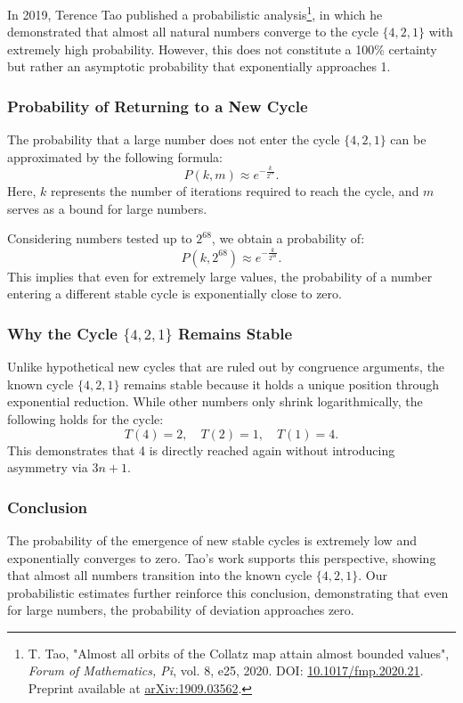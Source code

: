 \documentclass[a4paper,12pt]{article}
\begin{document}
In 2019, Terence Tao published a probabilistic analysis\footnote{T. Tao, "Almost all orbits of the Collatz map attain almost bounded values", \textit{Forum of Mathematics, Pi}, vol. 8, e25, 2020. DOI: \href{https://doi.org/10.1017/fmp.2020.21}{10.1017/fmp.2020.21}. Preprint available at \href{https://arxiv.org/abs/1909.03562}{arXiv:1909.03562}.}, in which he demonstrated that almost all natural numbers converge to the cycle \( \{4,2,1\} \) with extremely high probability. However, this does not constitute a 100\% certainty but rather an asymptotic probability that exponentially approaches 1.

\subsubsection{Probability of Returning to a New Cycle}

The probability that a large number does not enter the cycle \( \{4,2,1\} \) can be approximated by the following formula:
\[
P(k, m) \approx e^{-\frac{k}{2^m}}.
\]
Here, \( k \) represents the number of iterations required to reach the cycle, and \( m \) serves as a bound for large numbers.

Considering numbers tested up to \( 2^{68} \), we obtain a probability of:
\[
P(k, 2^{68}) \approx e^{-\frac{k}{2^{68}}}.
\]
This implies that even for extremely large values, the probability of a number entering a different stable cycle is exponentially close to zero.

\subsubsection{Why the Cycle \( \{4,2,1\} \) Remains Stable}

Unlike hypothetical new cycles that are ruled out by congruence arguments, the known cycle \( \{4,2,1\} \) remains stable because it holds a unique position through exponential reduction. While other numbers only shrink logarithmically, the following holds for the cycle:
\[
T(4) = 2, \quad T(2) = 1, \quad T(1) = 4.
\]
This demonstrates that 4 is directly reached again without introducing asymmetry via \( 3n+1 \).

\subsubsection{Conclusion}
The probability of the emergence of new stable cycles is extremely low and exponentially converges to zero. Tao’s work supports this perspective, showing that almost all numbers transition into the known cycle \( \{4,2,1\} \). Our probabilistic estimates further reinforce this conclusion, demonstrating that even for large numbers, the probability of deviation approaches zero.
\end{document}
